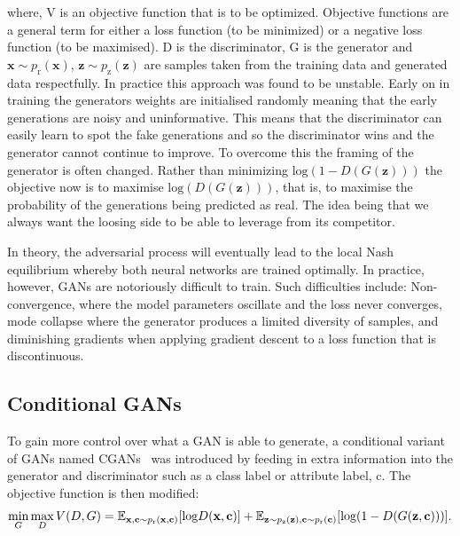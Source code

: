 \documentclass[12pt]{iopart}
\begin{document}
where, V is an objective function that is to be optimized. Objective functions are a general term for either a loss function (to be minimized) or a negative loss function (to be maximised). D is the discriminator, G is the generator and ${\mathbf{x} \sim p_{\text{r}}(\mathbf{x})}$, ${\mathbf{z} \sim p_{\text{z}}(\mathbf{z})}$ are samples taken from the training data and generated data respectfully. In practice this approach was found to be unstable. Early on in training the generators weights are initialised randomly meaning that the early generations are noisy and uninformative. This means that the discriminator can easily learn to spot the fake generations and so the discriminator wins and the generator cannot continue to improve. To overcome this the framing of the generator is often changed. Rather than minimizing $\text{log}(1-D(G(\mathbf{z})))$ the objective now is to maximise $\text{log}(D(G(\mathbf{z})))$, that is, to maximise the probability of the generations being predicted as real. The idea being that we always want the loosing side to be able to leverage from its competitor. 
%

%
In theory, the adversarial process will eventually lead to the local Nash
equilibrium \cite{Nash1950} whereby both neural networks are trained
optimally. In practice, however, \acp{GAN} are notoriously difficult
to train. Such difficulties include: Non-convergence, where the model
parameters oscillate and the loss never converges, mode collapse where the generator produces a
limited diversity of samples, and diminishing
gradients when applying gradient descent to a loss function that is discontinuous.

\subsection{Conditional GANs}

%
To gain more control over what a GAN is able to generate, a conditional variant of \acp{GAN} named \acp{CGAN}~\cite{cgan} was introduced by feeding in extra information into the generator and discriminator such as a class label or attribute label, c. The objective function is then modified:
\begin{equation}
  \mathop{\text{min}}_{G}  \mathop{\text{max}}_{D} V(D,G) = \mathbb{E}_{\mathbf{x,c} \sim p_{\text{r}}(\mathbf{x,c})} [\text{log} D(\mathbf{x,c})] \\ + \mathbb{E}_{\mathbf{z} \sim p_{\text{z}}(\mathbf{z}),\mathbf{c} \sim p_{\text{r}}(\mathbf{c})} [\text{log}(1-D(G(\mathbf{z,c})))].
\label{equation:cGANloss}
\end{equation}
\end{document}
